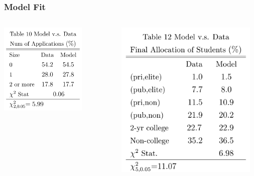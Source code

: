\documentclass[10pt]{beamer}
\begin{document}
\begin{frame}[c]\frametitle{Model Fit}
\begin{columns}
\centerline{\includegraphics[width=0.73\textwidth]{table10.png}}
\centerline{\includegraphics[width=0.95\textwidth]{table12.png}}

\end{columns}
\end{frame}
\end{document}
